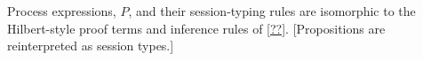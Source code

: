 







\begin{marginfigure}
\end{marginfigure}

Process expressions, $P$, and their session-typing rules are isomorphic to the Hilbert-style proof terms and inference rules of \cref{??}.
[Propositions are reinterpreted as session types.]




